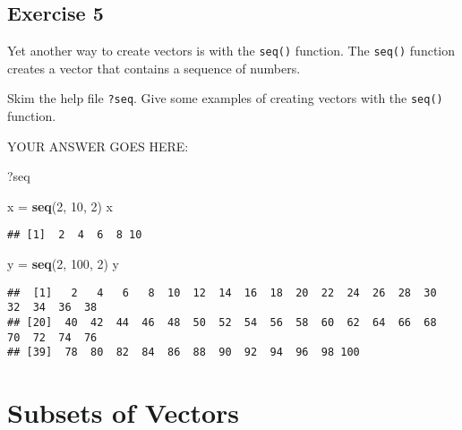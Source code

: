\documentclass[
]{article}
\newenvironment{Shaded}{\begin{snugshade}}{\end{snugshade}}
\newcommand{\DecValTok}[1]{\textcolor[rgb]{0.00,0.00,0.81}{#1}}
\newcommand{\KeywordTok}[1]{\textcolor[rgb]{0.13,0.29,0.53}{\textbf{#1}}}
\newcommand{\NormalTok}[1]{#1}
\newcommand{\StringTok}[1]{\textcolor[rgb]{0.31,0.60,0.02}{#1}}
\begin{document}
\hypertarget{exercise-5}{%
\subsection{Exercise 5}\label{exercise-5}}

Yet another way to create vectors is with the \texttt{seq()} function.
The \texttt{seq()} function creates a vector that contains a sequence of
numbers.

Skim the help file \texttt{?seq}. Give some examples of creating vectors
with the \texttt{seq()} function.

YOUR ANSWER GOES HERE:

\begin{Shaded}
\begin{Highlighting}[]
\NormalTok{?seq}
\end{Highlighting}
\end{Shaded}

\begin{Shaded}
\begin{Highlighting}[]
\NormalTok{x =}\StringTok{ }\KeywordTok{seq}\NormalTok{(}\DecValTok{2}\NormalTok{, }\DecValTok{10}\NormalTok{, }\DecValTok{2}\NormalTok{)}
\NormalTok{x}
\end{Highlighting}
\end{Shaded}

\begin{verbatim}
## [1]  2  4  6  8 10
\end{verbatim}

\begin{Shaded}
\begin{Highlighting}[]
\NormalTok{y =}\StringTok{ }\KeywordTok{seq}\NormalTok{(}\DecValTok{2}\NormalTok{, }\DecValTok{100}\NormalTok{, }\DecValTok{2}\NormalTok{)}
\NormalTok{y}
\end{Highlighting}
\end{Shaded}

\begin{verbatim}
##  [1]   2   4   6   8  10  12  14  16  18  20  22  24  26  28  30  32  34  36  38
## [20]  40  42  44  46  48  50  52  54  56  58  60  62  64  66  68  70  72  74  76
## [39]  78  80  82  84  86  88  90  92  94  96  98 100
\end{verbatim}

\hypertarget{subsets-of-vectors}{%
\section{Subsets of Vectors}\label{subsets-of-vectors}}
\end{document}
